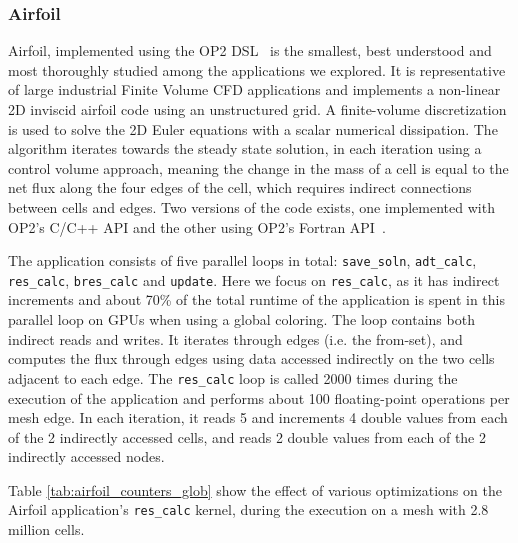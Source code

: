 \subsubsection{Airfoil}

\noindent Airfoil, implemented using the OP2 DSL~\cite{op2} is the smallest, 
best understood and most thoroughly studied among the applications we explored. 
It is representative of large industrial Finite Volume CFD applications and 
implements a non-linear 2D inviscid airfoil code using an unstructured grid. A 
finite-volume discretization is used to solve the 2D Euler equations with a 
scalar numerical dissipation. The algorithm iterates towards the steady state 
solution, in each iteration using a control volume approach, meaning the change 
in the mass of a cell is equal to the net flux along the four edges of the cell, 
which requires indirect connections between cells and edges. Two versions of the 
code exists, one implemented with OP2's C/C++ API and the other using OP2's 
Fortran API~\cite{giles2012op2,op2-repo}.

The application consists of five parallel loops in total: \texttt{save\_soln}, 
\texttt{adt\_calc}, \texttt{res\_calc}, \texttt{bres\_calc} and \texttt{update}.
Here we focus on \texttt{res\_calc}, as it has indirect increments and about 
70\% of the total runtime of the application is spent in this parallel loop on 
GPUs when using a global coloring. The loop contains both indirect reads and 
writes. It iterates through edges (i.e. the from-set), and computes the flux 
through edges using data accessed indirectly on the two cells adjacent to each 
edge. The \texttt{res\_calc} loop is called 2000 times during the  
execution of the application and performs about 100 floating-point operations 
per mesh edge. In each iteration, it reads 5 and increments 4 double values from 
each of the 2 indirectly accessed cells, and reads 2 double values from each of 
the 2 indirectly accessed nodes. 

Table \ref{tab:airfoil_counters_glob} show the effect of various optimizations 
on the Airfoil application's \texttt{res\_calc} kernel, during the execution on 
a mesh with 2.8 million cells.


